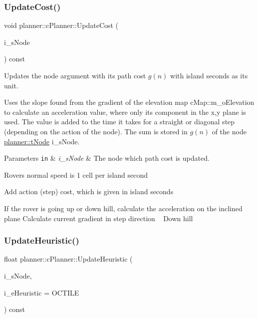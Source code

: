 \subsubsection{\texorpdfstring{Update\+Cost()}{UpdateCost()}}
{\footnotesize\ttfamily void planner\+::c\+Planner\+::\+Update\+Cost (\begin{DoxyParamCaption}\item[{\mbox{\hyperlink{structplanner_1_1t_node}{t\+Node}} $\ast$}]{i\+\_\+s\+Node }\end{DoxyParamCaption}) const}



Updates the node argument with its path cost $g(n)$ with island seconds as its unit. 

Uses the slope found from the gradient of the elevation map c\+Map\+::m\+\_\+o\+Elevation to calculate an acceleration value, where only its component in the x,y plane is used. The value is added to the time it takes for a straight or diagonal step (depending on the action of the node). The sum is stored in $g(n)$ of the node \mbox{\hyperlink{structplanner_1_1t_node}{planner\+::t\+Node}} i\+\_\+s\+Node. 
\begin{DoxyParams}[1]{Parameters}
\mbox{\tt in}  & {\em i\+\_\+s\+Node} & The node which path cost is updated. \\
\hline
\end{DoxyParams}
Rover\textquotesingle{}s normal speed is 1 cell per island second

Add action (step) cost, which is given in island seconds

If the rover is going up or down hill, calculate the acceleration on the inclined plane Calculate current gradient in step direction ~\newline
 Down hill \mbox{\label{classplanner_1_1c_planner_ad32a7c58b885456ced172b66fed854f0}} 
\subsubsection{\texorpdfstring{Update\+Heuristic()}{UpdateHeuristic()}\hspace{0.1cm}{\footnotesize\ttfamily [1/2]}}
{\footnotesize\ttfamily float planner\+::c\+Planner\+::\+Update\+Heuristic (\begin{DoxyParamCaption}\item[{\mbox{\hyperlink{structplanner_1_1t_node}{t\+Node}} $\ast$}]{i\+\_\+s\+Node,  }\item[{const t\+Heuristic}]{i\+\_\+e\+Heuristic = {\ttfamily OCTILE} }\end{DoxyParamCaption}) const}



